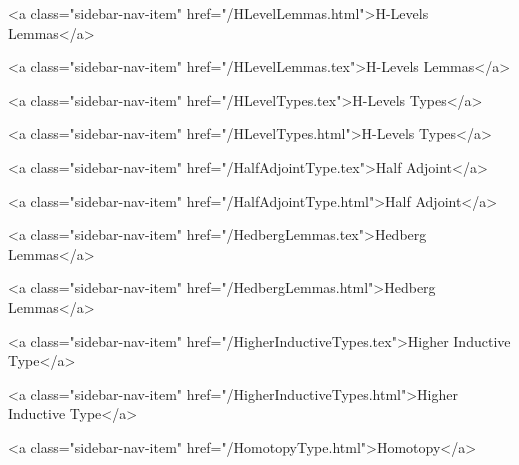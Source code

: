       
        
          <a class="sidebar-nav-item" href="/HLevelLemmas.html">H-Levels Lemmas</a>
        
      
    
      
        
          <a class="sidebar-nav-item" href="/HLevelLemmas.tex">H-Levels Lemmas</a>
        
      
    
      
        
          <a class="sidebar-nav-item" href="/HLevelTypes.tex">H-Levels Types</a>
        
      
    
      
        
          <a class="sidebar-nav-item" href="/HLevelTypes.html">H-Levels Types</a>
        
      
    
      
        
          <a class="sidebar-nav-item" href="/HalfAdjointType.tex">Half Adjoint</a>
        
      
    
      
        
          <a class="sidebar-nav-item" href="/HalfAdjointType.html">Half Adjoint</a>
        
      
    
      
        
          <a class="sidebar-nav-item" href="/HedbergLemmas.tex">Hedberg Lemmas</a>
        
      
    
      
        
          <a class="sidebar-nav-item" href="/HedbergLemmas.html">Hedberg Lemmas</a>
        
      
    
      
        
          <a class="sidebar-nav-item" href="/HigherInductiveTypes.tex">Higher Inductive Type</a>
        
      
    
      
        
          <a class="sidebar-nav-item" href="/HigherInductiveTypes.html">Higher Inductive Type</a>
        
      
    
      
        
          <a class="sidebar-nav-item" href="/HomotopyType.html">Homotopy</a>
        
